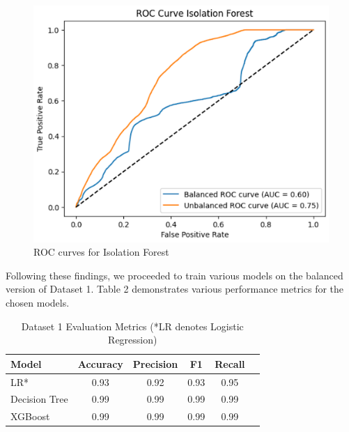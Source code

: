 \documentclass{article}
\begin{document}
\begin{figure}[htbp]
\centering
\includegraphics[width=\linewidth]{image/roc_isolation_forest.png} %
\caption{ROC curves for Isolation Forest}
\label{fig:my_photo} %
\end{figure}

Following these findings, we proceeded to train various models on the balanced version of Dataset 1. Table 2 demonstrates various performance metrics for the chosen models. 

\begin{table}[ht]
\centering

\label{tab:card_trans_metrics}
\begin{tabular}{lccccc}
\toprule
Model & Accuracy & Precision & F1 & Recall\\
\midrule
LR* & 0.93 & 0.92& 0.93& 0.95\\
Decision Tree & 0.99& 0.99& 0.99& 0.99\\
XGBoost & 0.99& 0.99& 0.99& 0.99\\
\bottomrule
\end{tabular}
\caption{Dataset 1 Evaluation Metrics  (*LR denotes Logistic Regression)}
\end{table}
\end{document}
